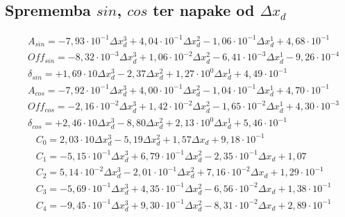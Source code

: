 \subsection{Sprememba $sin$, $cos$ ter napake od $\Delta x_d$}
\begin{eqnarray}
&A_{sin} = -7,93\cdot 10^{-1}\Delta x_d^3+4,04\cdot 10^{-1}\Delta x_d^2-1,06\cdot 10^{-1}\Delta x_d^1+4,68\cdot 10^{-1}            \\  
&Off_{sin} = -8,32\cdot 10^{-3}\Delta x_d^3+1,06\cdot 10^{-2}\Delta x_d^2-6,41\cdot 10^{-3}\Delta x_d^1-9,26\cdot 10^{-4}            \\
&\delta_{sin} = +1,69\cdot 10    \Delta x_d^3-2,37            \Delta x_d^2+1,27\cdot 10^{0}\Delta x_d^1+4,49\cdot 10^{-1}            \\
&A_{cos} = -7,92\cdot 10^{-1}\Delta x_d^3+4,00\cdot 10^{-1}\Delta x_d^2-1,04\cdot 10^{-1}\Delta x_d^1+4,70\cdot 10^{-1}            \\  
&Off_{cos} = -2,16\cdot 10^{-2}\Delta x_d^3+1,42\cdot 10^{-2}\Delta x_d^2-1,65\cdot 10^{-2}\Delta x_d^1+4,30\cdot 10^{-3}            \\
&\delta_{cos} = +2,46\cdot 10    \Delta x_d^3-8,80            \Delta x_d^2+2,13\cdot 10^{0}\Delta x_d^1+5,46\cdot 10^{-1}
\end{eqnarray}
\begin{eqnarray}
&C_0 =2,03\cdot 10\Delta x_d^{3}-5,19\Delta x_d^{2}+1,57\Delta x_d+9,18\cdot 10^{-1} \\                                
&C_1 =-5,15\cdot 10^{-1}\Delta x_d^{3}+6,79\cdot 10^{-1}\Delta x_d^{2}-2,35\cdot 10^{-1}\Delta x_d+1,07 \\             
&C_2 =5,14\cdot 10^{-2}\Delta x_d^{3}-2,01\cdot 10^{-1}\Delta x_d^{2}+7,16\cdot 10^{-2}\Delta x_d+1,29\cdot 10^{-1} \\ 
&C_3 =-5,69\cdot 10^{-1}\Delta x_d^{3}+4,35\cdot 10^{-1}\Delta x_d^{2}-6,56\cdot 10^{-2}\Delta x_d+1,38\cdot 10^{-1} \\
&C_4 =-9,45\cdot 10^{-1}\Delta x_d^{3}+9,30\cdot 10^{-1}\Delta x_d^{2}-8,31\cdot 10^{-2}\Delta x_d+2,89\cdot 10^{-1}
\end{eqnarray}




